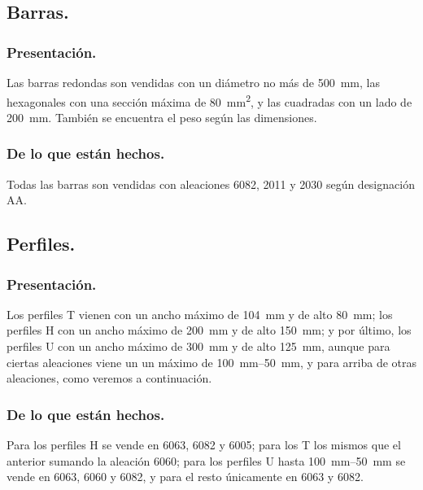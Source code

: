 \documentclass[12pt,a4paper]{article}
\begin{document}
\subsection{Barras.}

\subsubsection{Presentación.}

Las barras redondas son vendidas con un diámetro no más de \SI{500}{\milli\metre}, las hexagonales con una sección máxima de \SI{80}{mm^2}, y las cuadradas con un lado de \SI{200}{\milli\metre}. También se encuentra el peso según las dimensiones.

\subsubsection{De lo que están hechos.}

Todas las barras son vendidas con aleaciones 6082, 2011 y 2030 según designación AA.

\subsection{Perfiles.}

\subsubsection{Presentación.}

Los perfiles T vienen con un ancho máximo de \SI{104}{\milli\metre} y de alto \SI{80}{\milli\metre}; los perfiles H con un ancho máximo de \SI{200}{\milli\metre} y de alto \SI{150}{\milli\metre}; y por último, los perfiles U con un ancho máximo de \SI{300}{\milli\metre} y de alto \SI{125}{\milli\metre}, aunque para ciertas aleaciones viene un un máximo de \SIrange[range-phrase = { y }, range-units=single]{100}{50}{\milli\metre}, y para arriba de otras aleaciones, como veremos a continuación.

\subsubsection{De lo que están hechos.}

Para los perfiles H se vende en 6063, 6082 y 6005; para los T los mismos que el anterior sumando la aleación 6060; para los perfiles U hasta \SIrange[range-phrase = { y }, range-units=single]{100}{50}{\milli\metre} se vende en 6063, 6060 y 6082, y para el resto únicamente en 6063 y 6082.
\end{document}
